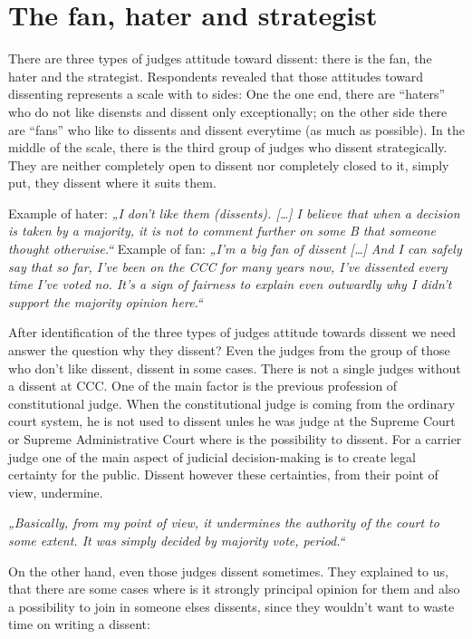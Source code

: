 \documentclass[
  11pt,
]{article}
\begin{document}
\hypertarget{the-fan-hater-and-strategist}{%
\section{The fan, hater and
strategist}\label{the-fan-hater-and-strategist}}

There are three types of judges attitude toward dissent: there is the
fan, the hater and the strategist. Respondents revealed that those
attitudes toward dissenting represents a scale with to sides: One the
one end, there are ``haters'' who do not like disensts and dissent only
exceptionally; on the other side there are ``fans'' who like to dissents
and dissent everytime (as much as possible). In the middle of the scale,
there is the third group of judges who dissent strategically. They are
neither completely open to dissent nor completely closed to it, simply
put, they dissent where it suits them.

Example of hater: \emph{„I don't like them (dissents). {[}\ldots{]} I
believe that when a decision is taken by a majority, it is not to
comment further on some B that someone thought otherwise.``} Example of
fan: \emph{„I'm a big fan of dissent {[}\ldots{]} And I can safely say
that so far, I've been on the CCC for many years now, I've dissented
every time I've voted no. It's a sign of fairness to explain even
outwardly why I didn't support the majority opinion here.``}

After identification of the three types of judges attitude towards
dissent we need answer the question why they dissent? Even the judges
from the group of those who don't like dissent, dissent in some cases.
There is not a single judges without a dissent at CCC. One of the main
factor is the previous profession of constitutional judge. When the
constitutional judge is coming from the ordinary court system, he is not
used to dissent unles he was judge at the Supreme Court or Supreme
Administrative Court where is the possibility to dissent. For a carrier
judge one of the main aspect of judicial decision-making is to create
legal certainty for the public. Dissent however these certainties, from
their point of view, undermine.

\emph{„Basically, from my point of view, it undermines the authority of
the court to some extent. It was simply decided by majority vote,
period.``}

On the other hand, even those judges dissent sometimes. They explained
to us, that there are some cases where is it strongly principal opinion
for them and also a possibility to join in someone elses dissents, since
they wouldn't want to waste time on writing a dissent:
\end{document}
